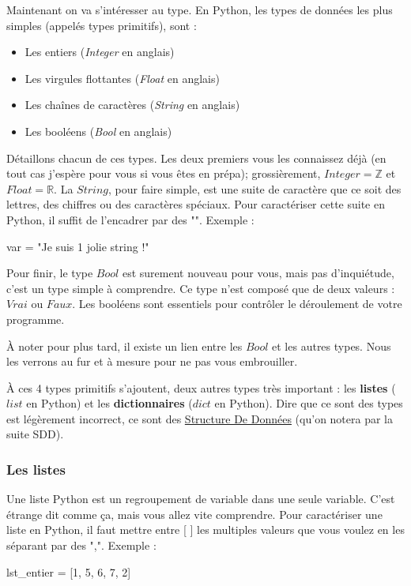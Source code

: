 \documentclass[a4paper,12pt]{article}
\begin{document}
Maintenant on va s'intéresser au type. En Python, les types de données les plus simples (appelés types primitifs), sont : 
\begin{itemize}
    \item Les entiers (\textit{Integer} en anglais)
    \item Les virgules flottantes (\textit{Float} en anglais)
    \item Les chaînes de caractères (\textit{String} en anglais)
    \item Les booléens (\textit{Bool} en anglais)
\end{itemize}

Détaillons chacun de ces types. Les deux premiers vous les connaissez déjà (en tout cas j'espère pour vous si vous êtes en prépa); grossièrement, $Integer = \mathbb{Z}$ et
$Float = \mathbb{R}$.
La $String$, pour faire simple, est une suite de caractère que ce soit des lettres, des chiffres ou des caractères spéciaux.
Pour caractériser cette suite en Python, il suffit de l'encadrer par des "". Exemple : 
\begin{pythoncode}
    var = "Je suis 1 jolie string !"
\end{pythoncode}
Pour finir, le type $Bool$ est surement nouveau pour vous, mais pas d'inquiétude, c'est un type simple à comprendre. Ce type n'est composé que de deux valeurs :
$Vrai$ ou $Faux$. Les booléens sont essentiels pour contrôler le déroulement de votre programme.

{\color{cyan}
\vspace{1.0em}
À noter pour plus tard, il existe un lien entre les $Bool$ et les autres types. Nous les verrons au fur et à mesure pour ne pas vous embrouiller. \newline
}

À ces 4 types primitifs s'ajoutent, deux autres types très important : les \textbf{listes} ($list$ en Python) et les \textbf{dictionnaires} ($dict$ en Python).
Dire que ce sont des types est légèrement incorrect, ce sont des \underline{Structure De Données} (qu'on notera par la suite SDD).

\subsubsection{Les listes}

Une liste Python est un regroupement de variable dans une seule variable. C'est étrange dit comme ça, mais vous allez vite comprendre. 
Pour caractériser une liste en Python, il faut mettre entre [ ] les multiples valeurs que vous voulez en les séparant par des ",". Exemple : 
\begin{pythoncode}
    lst_entier = [1, 5, 6, 7, 2]
\end{pythoncode}
\end{document}
